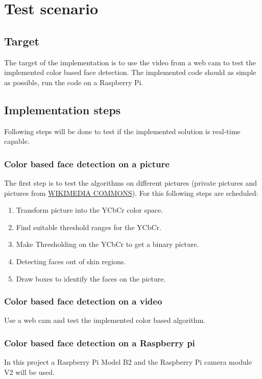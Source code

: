 \documentclass[Bachelorarbeit.tex]{subfiles}
\begin{document}
\chapter{Test scenario}
\section{Target}
The target of the implementation is to use the video from a web cam to test the implemented color based face detection. The implemented code should as simple as possible, run the code on a Raspberry Pi.

\section{Implementation steps}
Following steps will be done to test if the implemented solution is real-time capable.

\subsection{Color based face detection on a picture}
The first step is to test the algorithms on different pictures (private pictures and pictures from \href{https://commons.wikimedia.org/wiki/Main_Page}{WIKIMEDIA COMMONS}). For this following steps are scheduled:
\begin{enumerate}
\item Transform picture into the YCbCr color space.
\item Find suitable threshold ranges for the YCbCr.
\item Make Thresholding on the YCbCr to get a binary picture.
\item Detecting faces out of skin regions.
\item Draw boxes to identify the faces on the picture.
\end{enumerate}

\subsection{Color based face detection on a video}\label{CbVidoe}
Use a web cam and test the implemented color based algorithm.

\subsection{Color based face detection on a Raspberry pi}
In this project a Raspberry Pi Model B2 and the Raspberry Pi camera module V2 will be used.
\end{document}
